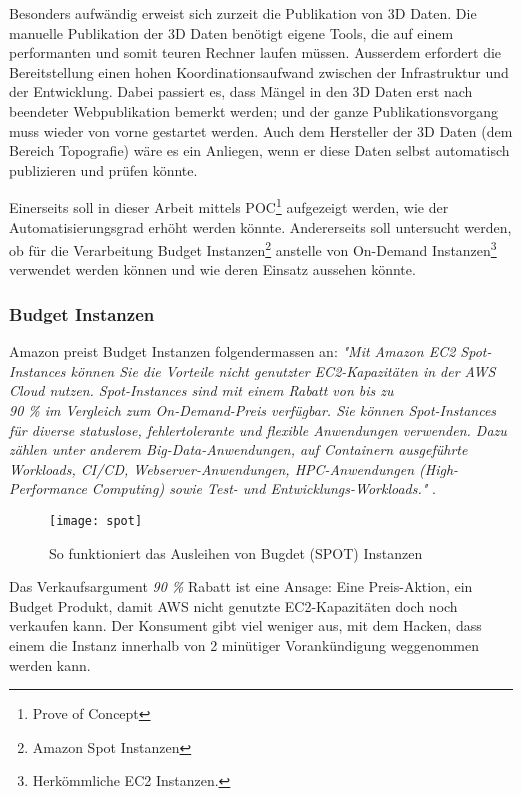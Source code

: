 Besonders aufwändig erweist sich zurzeit die Publikation von 3D Daten. Die manuelle Publikation
der 3D Daten benötigt eigene Tools, die auf einem performanten und somit teuren Rechner laufen
müssen. Ausserdem erfordert die Bereitstellung einen hohen Koordinationsaufwand zwischen der
Infrastruktur und der Entwicklung. Dabei passiert es, dass Mängel in den 3D Daten erst nach
beendeter Webpublikation bemerkt werden; und der ganze Publikationsvorgang muss wieder von
vorne gestartet werden.
Auch dem Hersteller der 3D Daten (dem Bereich Topografie) wäre es ein Anliegen, wenn er diese
Daten selbst automatisch publizieren und prüfen könnte.

Einerseits soll in dieser Arbeit mittels POC\footnote{Prove of Concept} aufgezeigt werden, wie der Automatisierungsgrad erhöht werden könnte. Andererseits soll untersucht werden, ob für die Verarbeitung Budget Instanzen\footnote{Amazon Spot Instanzen} anstelle von On-Demand Instanzen\footnote{Herkömmliche EC2 Instanzen.} verwendet werden können und wie deren Einsatz aussehen könnte.

\subsubsection{Budget Instanzen}
Amazon preist Budget Instanzen folgendermassen an: \textit{"Mit Amazon EC2 Spot-Instances können Sie die Vorteile nicht genutzter EC2-Kapazitäten in der AWS Cloud nutzen. Spot-Instances sind mit einem Rabatt von bis zu\\ 90 \% im Vergleich zum On-Demand-Preis verfügbar. Sie können Spot-Instances für diverse statuslose, fehlertolerante und flexible Anwendungen verwenden. Dazu zählen unter anderem Big-Data-Anwendungen, auf Containern ausgeführte Workloads, CI/CD, Webserver-Anwendungen, HPC-Anwendungen (High-Performance Computing) sowie Test- und Entwicklungs-Workloads."} \cite{AmazonAWSSpot:1}.


\begin{figure}[H]
	\centering
	\texttt{[image: spot]}
	\caption{So funktioniert das Ausleihen von Bugdet (SPOT) Instanzen}
	\label{fig:spot}
\end{figure}

Das Verkaufsargument \emph{90 \%} Rabatt ist eine Ansage: Eine Preis-Aktion, ein Budget Produkt, damit AWS nicht genutzte EC2-Kapazitäten doch noch verkaufen kann. Der Konsument gibt viel weniger aus, mit dem Hacken, dass einem die Instanz innerhalb von 2 minütiger Vorankündigung weggenommen werden kann.

